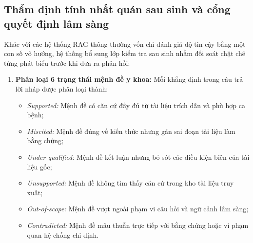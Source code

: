\subsection{Thẩm định tính nhất quán sau sinh và cổng quyết định lâm sàng}
Khác với các hệ thống RAG thông thường vốn chỉ đánh giá độ tin cậy bằng một con số vô hướng, hệ thống bổ sung lớp kiểm tra sau sinh nhằm đối soát chặt chẽ từng phát biểu trước khi đưa ra phản hồi:
\begin{enumerate}
    \item \textbf{Phân loại 6 trạng thái mệnh đề y khoa:} Mỗi khẳng định trong câu trả lời nháp được phân loại thành:
    \begin{itemize}
        \item \emph{Supported:} Mệnh đề có căn cứ đầy đủ từ tài liệu trích dẫn và phù hợp ca bệnh;
        \item \emph{Miscited:} Mệnh đề đúng về kiến thức nhưng gán sai đoạn tài liệu làm bằng chứng;
        \item \emph{Under-qualified:} Mệnh đề kết luận nhưng bỏ sót các điều kiện biên của tài liệu gốc;
        \item \emph{Unsupported:} Mệnh đề không tìm thấy căn cứ trong kho tài liệu truy xuất;
        \item \emph{Out-of-scope:} Mệnh đề vượt ngoài phạm vi câu hỏi và ngữ cảnh lâm sàng;
        \item \emph{Contradicted:} Mệnh đề mâu thuẫn trực tiếp với bằng chứng hoặc vi phạm quan hệ chống chỉ định.
    \end{itemize}


\end{enumerate}
